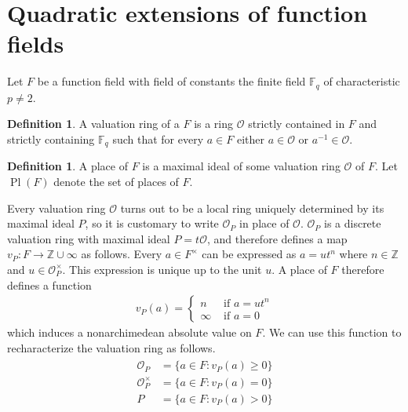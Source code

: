 \documentclass{dcthesis}
\newcommand{\ZZ}{\mathbb Z}
\newcommand{\defi}[1]{\textsf{#1}}
\newcommand{\FF}{\mathbb{F}}
\DeclareMathOperator{\Pl}{Pl}
\numberwithin{equation}{section}
\theoremstyle{definition}
\newtheorem{definition}[equation]{Definition}
\theoremstyle{remark}
\begin{document}
{  \section{Quadratic extensions of function fields}{\label{sec:functionfieldextensions}
    Let $F$ be a function field
    with field of constants the
    finite field $\FF_q$
    of characteristic $p\neq 2$.
    \begin{definition}
      \label{def:valuationring}
      A \defi{valuation ring} of a $F$
      is a ring $\mathcal{O}$
      strictly contained in $F$
      and strictly containing $\FF_q$
      such that for every $a\in F$
      either $a\in\mathcal{O}$
      or $a^{-1}\in\mathcal{O}$.
    \end{definition}
    \begin{definition}
      \label{def:places}
      A \defi{place} of $F$ is a maximal ideal of
      some valuation ring $\mathcal{O}$ of $F$.
      Let $\Pl(F)$ denote the set of places of $F$.
    \end{definition}
    Every valuation ring $\mathcal{O}$
    turns out to be a local ring uniquely
    determined by its maximal ideal $P$,
    so it is customary to write
    $\mathcal{O}_P$ in place of $\mathcal{O}$.
    $\mathcal{O}_P$ is a
    discrete valuation ring with
    maximal ideal $P=t\mathcal{O}$,
    and therefore
    defines a map $v_P\colon F\to\ZZ\cup\infty$
    as follows.
    Every $a\in F^\times$
    can be expressed as $a=ut^n$
    where $n\in\ZZ$ and $u\in\mathcal{O}_P^\times$.
    This expression is unique up to the unit $u$.
    A place of $F$ therefore defines a function
    \begin{align}
      \label{eqn:vP}
      v_P(a) =
      \begin{cases}
        n&\text{ if }a=ut^n\\
        \infty&\text{ if }a=0
      \end{cases}
    \end{align}
    which induces a nonarchimedean absolute value
    on $F$.
    We can use this function to recharacterize
    the valuation ring as follows.
    \begin{align}
      \label{eqn:valuationringfromabs}
      \begin{split}
        \mathcal{O}_P
        &= \{a\in F : v_P(a)\geq 0\}\\
        \mathcal{O}_P^\times
        &= \{a\in F : v_P(a)=0\}\\
        P
        &=\{a\in F : v_P(a)>0\}
      \end{split}

\end{align}}}
\end{document}
